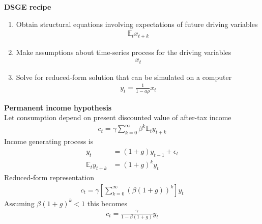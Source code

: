 \documentclass{beamer}
\begin{document}
\begin{frame}
  \textbf{DSGE recipe}
  \begin{enumerate}
  \item Obtain structural equations involving expectations of future driving variables
  \begin{align*}
    \mathbb{E}_tx_{t+k}
  \end{align*}
  \item Make assumptions about time-series process for the driving variables 
  \begin{align*}
    x_t
  \end{align*}
  \item Solve for reduced-form solution that can be simulated on a computer
  \begin{align*}
    y_t=\frac{1}{1-a\rho}x_t
  \end{align*}
\end{enumerate}
\end{frame}

\begin{frame}
  \textbf{Permanent income hypothesis}\\
  Let consumption depend on present discounted value of after-tax income
\begin{align}
  c_t=\gamma \sum^{\infty}_{k=0}\beta^k \mathbb{E}_ty_{t+k}
\end{align}
\medskip
 Income generating process is 
 \begin{align}
   y_t&= (1+g)y_{t-1}+\epsilon_t \\
   \mathbb{E}_ty_{t+k}&=(1+g)^ky_t
 \end{align}
 \medskip
 Reduced-form representation
 \begin{align}
    c_t=\gamma \left[\sum^{\infty}_{k=0} (\beta(1+g))^k \right ]y_t
  \end{align}
  \medskip
  Assuming $\beta(1+g)^k<1$ this becomes  
\begin{align}
  c_t=\frac{\gamma}{1-\beta(1+g)}y_t
\end{align}
\end{frame}
\end{document}
